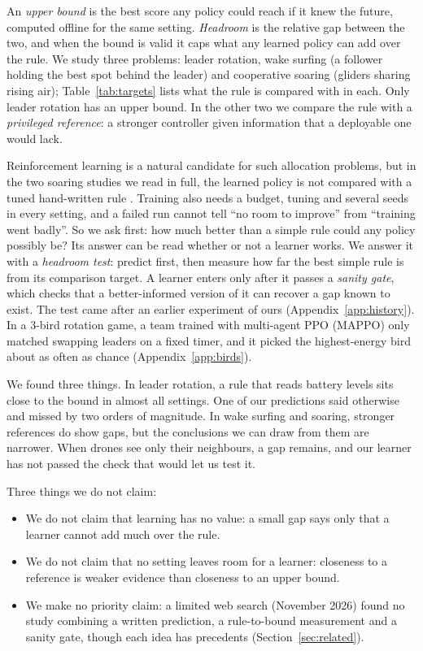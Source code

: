 \documentclass[11pt]{article}
\begin{document}
An \emph{upper bound} is the best score any policy could reach if it knew the future, computed offline for the same setting.
\emph{Headroom} is the relative gap between the two, and when the bound is valid it caps what any learned policy can add over the rule.
We study three problems: leader rotation, wake surfing (a follower holding the best spot behind the leader) and cooperative soaring (gliders sharing rising air); Table~\ref{tab:targets} lists what the rule is compared with in each.
Only leader rotation has an upper bound.
In the other two we compare the rule with a \emph{privileged reference}: a stronger controller given information that a deployable one would lack.

Reinforcement learning is a natural candidate for such allocation problems, but in the two soaring studies we read in full, the learned policy is not compared with a tuned hand-written rule \citep{reddy2016,flato2024}.
Training also needs a budget, tuning and several seeds in every setting, and a failed run cannot tell ``no room to improve'' from ``training went badly''.
So we ask first: how much better than a simple rule could any policy possibly be?
Its answer can be read whether or not a learner works.
We answer it with a \emph{headroom test}: predict first, then measure how far the best simple rule is from its comparison target.
A learner enters only after it passes a \emph{sanity gate}, which checks that a better-informed version of it can recover a gap known to exist.
The test came after an earlier experiment of ours (Appendix~\ref{app:history}).
In a 3-bird rotation game, a team trained with multi-agent PPO (MAPPO) \citep{yu2022mappo} only matched swapping leaders on a fixed timer, and it picked the highest-energy bird about as often as chance (Appendix~\ref{app:birds}).

We found three things.
In leader rotation, a rule that reads battery levels sits close to the bound in almost all settings.
One of our predictions said otherwise and missed by two orders of magnitude.
In wake surfing and soaring, stronger references do show gaps, but the conclusions we can draw from them are narrower.
When drones see only their neighbours, a gap remains, and our learner has not passed the check that would let us test it.

Three things we do not claim:
\begin{itemize}\setlength{\itemsep}{0pt}\setlength{\topsep}{0.2em}
\item We do not claim that learning has no value: a small gap says only that a learner cannot add much over the rule.
\item We do not claim that no setting leaves room for a learner: closeness to a reference is weaker evidence than closeness to an upper bound.
\item We make no priority claim: a limited web search (November 2026) found no study combining a written prediction, a rule-to-bound measurement and a sanity gate, though each idea has precedents (Section~\ref{sec:related}).
\end{itemize}
\end{document}
